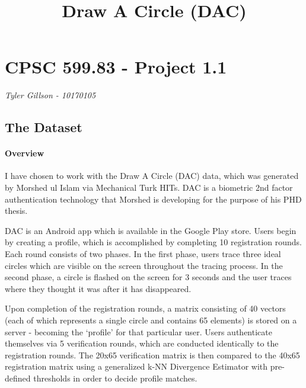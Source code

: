 \documentclass[11pt]{article}
\title{Draw A Circle (DAC)}
\begin{document}
    
    
    \maketitle
    
    

    
    \hypertarget{cpsc-599.83---project-1.1}{%
\section{CPSC 599.83 - Project 1.1}\label{cpsc-599.83---project-1.1}}

    \emph{Tyler Gillson - 10170105}

    \hypertarget{the-dataset}{%
\subsection{The Dataset}\label{the-dataset}}

    \hypertarget{overview}{%
\paragraph{Overview}\label{overview}}

    I have chosen to work with the Draw A Circle (DAC) data, which was
generated by Morshed ul Islam via Mechanical Turk HITs. DAC is a
biometric 2nd factor authentication technology that Morshed is
developing for the purpose of his PHD thesis.

DAC is an Android app which is available in the Google Play store. Users
begin by creating a profile, which is accomplished by completing 10
registration rounds. Each round consists of two phases. In the first
phase, users trace three ideal circles which are visible on the screen
throughout the tracing process. In the second phase, a circle is flashed
on the screen for 3 seconds and the user traces where they thought it
was after it has disappeared.

Upon completion of the registration rounds, a matrix consisting of 40
vectors (each of which represents a single circle and contains 65
elements) is stored on a server - becoming the `profile' for that
particular user. Users authenticate themselves via 5 verification
rounds, which are conducted identically to the registration rounds. The
20x65 verification matrix is then compared to the 40x65 registration
matrix using a generalized k-NN Divergence Estimator with pre-defined
thresholds in order to decide profile matches.
\end{document}
